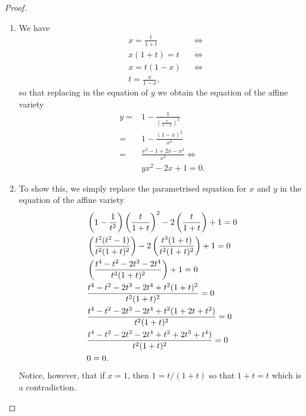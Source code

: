 \begin{proof}
\begin{enumerate}
    \item We have 
    \begin{align*}
        &x = \frac{t}{1+t} &&\iff\\
        &x(1+t) = t &&\iff\\
        &x = t(1-x) &&\iff\\
        &t = \frac{x}{1-x},
    \end{align*}
    so that replacing in the equation of $y$ we obtain the equation of the affine variety
    \begin{align*}
        y =& 1 -\frac{1}{\left(\frac{x}{1-x}\right)^2}\\
        =& 1-\frac{(1-x)^2}{x^2}\\
        =& \frac{x^2-1+2x-x^2}{x^2}\iff\\
        &yx^2-2x+1=0.
    \end{align*}
    \item To show this, we simply replace the parametrised equation for $x$ and $y$ in the equation of the affine variety
    \begin{align*}
        &\left( 1-\frac{1}{t^2}\right)\left( \frac{t}{1+t}\right)^2-2\left( \frac{t}{1+t}\right)+1=0\\
        &\left( \frac{t^2(t^2-1)}{t^2(1+t)^2}\right)-2\left( \frac{t^3(1+t)}{t^2(1+t)^2}\right)+1=0\\
        &\left( \frac{t^4-t^2-2t^3-2t^4}{t^2(1+t)^2}\right)+1=0\\
        &\frac{t^4-t^2-2t^3-2t^4+t^2(1+t)^2}{t^2(1+t)^2}=0\\
        &\frac{t^4-t^2-2t^3-2t^4+t^2(1+2t+t^2)}{t^2(1+t)^2}=0\\
        &\frac{t^4-t^2-2t^3-2t^4+t^2+2t^3+t^4)}{t^2(1+t)^2}=0\\
        &0=0.
    \end{align*}
    Notice, however, that if $x=1$, then $1=t/(1+t)$ so that $1+t=t$ which is a contradiction.
\end{enumerate}
\end{proof}

